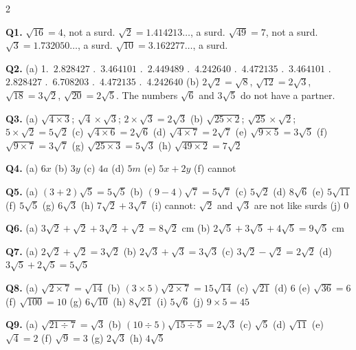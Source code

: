 \documentclass[12pt,a4paper]{article}
\begin{document}
{\small
\begin{multicols}{2}
\raggedcolumns
\setlength{\parskip}{4pt}

\textbf{Q1.} $\sqrt{16}=4$, not a surd. \quad $\sqrt{2}=1.414213\ldots$, a
surd. \quad $\sqrt{49}=7$, not a surd. \quad $\sqrt{3}=1.732050\ldots$, a
surd. \quad $\sqrt{10}=3.162277\ldots$, a surd.

\textbf{Q2.} (a) 1.~$2.828427$ .~$3.464101$ .~$2.449489$ .~$4.242640$ .~$4.472135$ .~$3.464101$ .~$2.828427$
.~$6.708203$ .~$4.472135$ .~$4.242640$ \quad
(b) $2\sqrt{2}=\sqrt{8}$, \; $\sqrt{12}=2\sqrt{3}$, \; $\sqrt{18}=3\sqrt{2}$,
\; $\sqrt{20}=2\sqrt{5}$. The numbers $\sqrt{6}$ and $3\sqrt{5}$ do not have
a partner.

\textbf{Q3.} (a) $\sqrt{4\times3}$; \; $\sqrt{4}\times\sqrt{3}$; \;
$2\times\sqrt{3}=2\sqrt{3}$ \quad (b) $\sqrt{25\times2}$; \;
$\sqrt{25}\times\sqrt{2}$; \; $5\times\sqrt{2}=5\sqrt{2}$ \quad
(c) $\sqrt{4\times6}=2\sqrt{6}$ \quad (d) $\sqrt{4\times7}=2\sqrt{7}$ \quad
(e) $\sqrt{9\times5}=3\sqrt{5}$ \quad (f) $\sqrt{9\times7}=3\sqrt{7}$ \quad
(g) $\sqrt{25\times3}=5\sqrt{3}$ \quad (h) $\sqrt{49\times2}=7\sqrt{2}$

\textbf{Q4.} (a) $6x$ \quad (b) $3y$ \quad (c) $4a$ \quad (d) $5m$ \quad
(e) $5x+2y$ \quad (f) cannot

\textbf{Q5.} (a) $(3+2)\sqrt{5}=5\sqrt{5}$ \quad
(b) $(9-4)\sqrt{7}=5\sqrt{7}$ \quad (c) $5\sqrt{2}$ \quad (d) $8\sqrt{6}$
\quad (e) $5\sqrt{11}$ \quad (f) $5\sqrt{5}$ \quad (g) $6\sqrt{3}$ \quad
(h) $7\sqrt{2}+3\sqrt{7}$ \quad (i) cannot: $\sqrt{2}$ and $\sqrt{3}$ are not
like surds \quad (j) $0$

\textbf{Q6.} (a) $3\sqrt{2}+\sqrt{2}+3\sqrt{2}+\sqrt{2}=8\sqrt{2}$ cm \quad
(b) $2\sqrt{5}+3\sqrt{5}+4\sqrt{5}=9\sqrt{5}$ cm

\textbf{Q7.} (a) $2\sqrt{2}+\sqrt{2}=3\sqrt{2}$ \quad
(b) $2\sqrt{3}+\sqrt{3}=3\sqrt{3}$ \quad
(c) $3\sqrt{2}-\sqrt{2}=2\sqrt{2}$ \quad
(d) $3\sqrt{5}+2\sqrt{5}=5\sqrt{5}$

\textbf{Q8.} (a) $\sqrt{2\times7}=\sqrt{14}$ \quad
(b) $(3\times5)\sqrt{2\times7}=15\sqrt{14}$ \quad (c) $\sqrt{21}$ \quad
(d) $6$ \quad (e) $\sqrt{36}=6$ \quad (f) $\sqrt{100}=10$ \quad
(g) $6\sqrt{10}$ \quad (h) $8\sqrt{21}$ \quad (i) $5\sqrt{6}$ \quad
(j) $9\times5=45$

\textbf{Q9.} (a) $\sqrt{21\div7}=\sqrt{3}$ \quad
(b) $(10\div5)\sqrt{15\div5}=2\sqrt{3}$ \quad (c) $\sqrt{5}$ \quad
(d) $\sqrt{11}$ \quad (e) $\sqrt{4}=2$ \quad (f) $\sqrt{9}=3$ \quad
(g) $2\sqrt{3}$ \quad (h) $4\sqrt{5}$


\end{multicols}}
\end{document}

